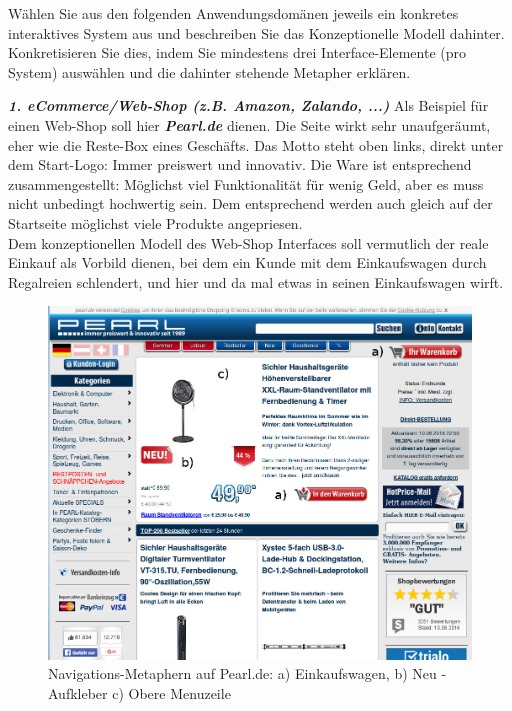 \documentclass[a4paper,10pt]{article}
\begin{document}
\kopf
\renewcommand{\figurename}{Figure}

Wählen Sie aus den folgenden Anwendungsdomänen jeweils ein konkretes interaktives System aus und beschreiben Sie das Konzeptionelle Modell dahinter. Konkretisieren Sie dies, indem Sie mindestens drei Interface-Elemente (pro System) auswählen und die dahinter stehende Metapher erklären. \newline
 
\textbf{\textit{1. eCommerce/Web-Shop (z.B. Amazon, Zalando, ...)}} \newline
Als Beispiel für einen Web-Shop soll hier \textbf{\textit {Pearl.de}} dienen. Die Seite wirkt sehr unaufgeräumt, eher wie die Reste-Box eines Geschäfts. Das Motto steht oben links, direkt unter dem Start-Logo: Immer preiswert und innovativ. Die Ware ist entsprechend zusammengestellt: Möglichst viel Funktionalität für wenig Geld, aber es muss nicht unbedingt hochwertig sein. Dem entsprechend werden auch gleich auf der Startseite möglichst viele Produkte angepriesen.\\
Dem konzeptionellen Modell des Web-Shop Interfaces soll vermutlich der reale Einkauf als Vorbild dienen, bei dem ein Kunde mit dem Einkaufswagen durch Regalreien schlendert, und hier und da mal etwas in seinen Einkaufswagen wirft.

\begin{figure}[H]
\centering \includegraphics[width=1\textwidth]{pearl.jpg}
\caption{Navigations-Metaphern auf Pearl.de: a) Einkaufswagen, b) Neu - Aufkleber c) Obere Menuzeile}
\end{figure}
\end{document}
